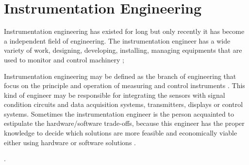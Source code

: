 \section{Instrumentation Engineering}\label{sec:instrumentationEngineering}

	Instrumentation engineering has existed for long but only recently it has become a independent field of engineering. The instrumentation engineer has a wide variety of work, designing, developing, installing, managing equipments that are used to monitor and control machinery \cite{careerIndia};
	\par
	Instrumentation engineering may be defined as the branch of engineering that focus on the principle and operation of measuring and control instruments \cite{webster2014measurement}. This kind of engineer may be responsible for integrating the sensors with signal condition circuits and data acquisition systems, transmitters, displays or control systems. Sometimes the instrumentation engineer is the person acquainted to estipulate the hardware/software trade-offs, because this engineer has the proper knowledge to decide which solutions are more feasible and economically viable either using hardware or software solutions \cite{mandell1972hardware}.
	\par
	\cite{instrumentation-control-engineering-perfectionists}.

	
	
	
	
	
	
	
	

	
	
	
	
